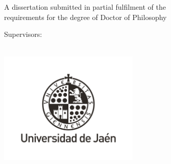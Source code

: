 \begin{center}
    \null\vspace{8mm}
    
    \libertineNormalCapital
    {
        \huge 
        \textcolor{redThesis}{
            \textls[30]
            {
                \titleEnglish
            }
        }
    
        \vspace{5mm}
        
        \Large
        \authorship
    }
    
    \vspace{5mm}
    
    \libertineNormal
    {
        \Large 
        A dissertation submitted in partial fulfilment of the\\
        \minorSpacing
        requirements for the degree of Doctor of Philosophy
    }
    
    \vspace{8mm}
    
    {
       \libertineNormalCapital
       \Large 
       Supervisors:\\
    
       \libertineNormal
       \mainSupervisor\\
       \minorSpacing
       \secondSupervisor
    }
    
    \vspace{15mm}
    
    \includegraphics[width=0.5\textwidth]{images/Uja/UjaPhDBlack.jpg}
    
    \vspace{3mm}
    
    {
        \libertineNormal
        \Large 
        \department\\
        \minorSpacing
        \polytechnicSchool\\
        \minorSpacing
        \university\\
    
        \vspace{12mm}
        \dateDissertation
    }
    
    \libertineNormal
    \newpage
\end{center}